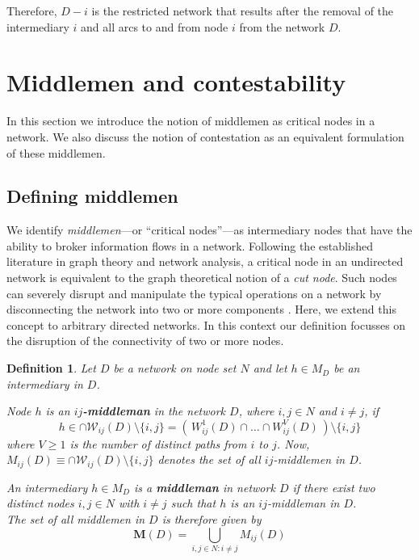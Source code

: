 \documentclass[11pt,fleqn]{article}
\newcounter{llst}
\newenvironment{abet}{\begin{list}{\rm (\alph{llst})}{\usecounter{llst}
\setlength{\itemindent}{0em} \setlength{\leftmargin}{3em}
\setlength{\labelwidth}{2em} \setlength{\labelsep}{1em}}}{\end{list}}
\newtheorem{definition}[theorem]{Definition}
\begin{document}
\noindent
Therefore, $D-i$ is the restricted network that results after the removal of the intermediary $i$ and all arcs to and from node $i$ from the network $D$.

\section{Middlemen and contestability}
\label{sec:MiddlemanContestability}

In this section we introduce the notion of middlemen as critical nodes in a network. We also discuss the notion of contestation as an equivalent formulation of these middlemen.

\subsection{Defining middlemen}

We identify \textit{middlemen}---or ``critical nodes''---as intermediary nodes that have the ability to broker information flows in a network. Following the established literature in graph theory and network analysis, a critical node in an undirected network is equivalent to the graph theoretical notion of a \emph{cut node}. Such nodes can severely disrupt and manipulate the typical operations on a network by disconnecting the network into two or more components \citep{KalaiMiddlemen1978,GillesChakrabarti2006}. Here, we extend this concept to arbitrary directed networks. In this context our definition focusses on the disruption of the connectivity of two or more nodes.

\begin{definition} \label{middleman}
Let $D$ be a network on node set $N$ and let $h \in M_D$ be an intermediary in $D$.
\begin{abet}
\item Node $h$ is an \textbf{$ij$-middleman} in the network $D$, where $i,j \in N$ and $i \neq j$, if
\begin{equation} \label{ijmiddleman}
h \in \cap \mathcal{W}_{ij}(D) \setminus \{ i,j \} = \left( \, W_{ij}^{1}(D) \cap  \ldots  \cap W_{ij}^{V}(D) \, \right) \setminus \{ i,j \}
\end{equation}
where $V \geqslant 1$ is the number of distinct paths from $i$ to $j$. Now, $M_{ij}(D) \equiv \cap \mathcal{W}_{ij}(D) \setminus \{ i,j \}$ denotes the set of all $ij$-middlemen in $D$.

\item An intermediary $h \in M_D$ is a \textbf{middleman} in network $D$ if there exist two distinct nodes $i,j \in N$ with $i \neq j$ such that $h$ is an $ij$-middleman in $D$. \\ The set of all middlemen in $D$ is therefore given by
\begin{equation} \label{middlemanseteq}
\mathbf{M} (D) = \bigcup_{i,j \in N \colon i \neq j} M_{ij}(D)
\end{equation}
\end{abet}
\end{definition}
\end{document}
